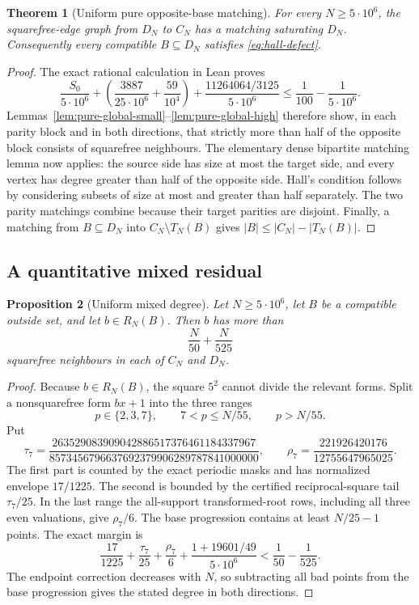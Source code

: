 \documentclass[11pt]{article}
\newtheorem{theorem}{Theorem}[section]
\newtheorem{proposition}[theorem]{Proposition}
\theoremstyle{definition}
\newcommand{\CN}{C_N}
\newcommand{\DN}{D_N}
\newcommand{\TN}{T_N}
\newcommand{\RN}{R_N}
\newcommand{\FiveMillion}{5\cdot10^6}
\begin{document}
\begin{theorem}[Uniform pure opposite-base matching]
\label{thm:pure-parity-matching}
For every $N\geq\FiveMillion$, the squarefree-edge graph from $\DN$ to
$\CN$ has a matching saturating $\DN$.  Consequently every compatible
$B\subseteq\DN$ satisfies \eqref{eq:hall-defect}.
\end{theorem}

\begin{proof}
The exact rational calculation in Lean proves
\begin{equation}\label{eq:pure-envelope}
 \frac{S_0}{\FiveMillion}
 +\left(\frac{3887}{25\cdot10^6}+\frac{59}{10^4}\right)
 +\frac{11264064/3125}{\FiveMillion}
 \leq\frac1{100}-\frac1{\FiveMillion}.
\end{equation}
Lemmas~\ref{lem:pure-global-small}--\ref{lem:pure-global-high} therefore
show, in each parity block and in both directions, that strictly more than
half of the opposite block consists of squarefree neighbours.  The elementary
dense bipartite matching lemma now applies: the source side has size at most
the target side, and every vertex has degree greater than half of the
opposite side.  Hall's condition follows by considering subsets of size at
most and greater than half separately.  The two parity matchings combine
because their target parities are disjoint.  Finally, a matching from
$B\subseteq\DN$ into $\CN\setminus\TN(B)$ gives
$|B|\leq|\CN|-|\TN(B)|$.
\end{proof}

\subsection{A quantitative mixed residual}

\begin{proposition}[Uniform mixed degree]\label{prop:uniform-mixed-degree}
Let $N\geq\FiveMillion$, let $B$ be a compatible outside set, and let
$b\in\RN(B)$.  Then $b$ has more than
\[
  \frac N{50}+\frac N{525}
\]
squarefree neighbours in each of $\CN$ and $\DN$.
\end{proposition}

\begin{proof}
Because $b\in\RN(B)$, the square $5^2$ cannot divide the relevant forms.
Split a nonsquarefree form $bx+1$ into the three ranges
\[
 p\in\{2,3,7\},\qquad 7<p\leq N/55,\qquad p>N/55.
\]
Put
\[
 \tau_7=
 \frac{263529083909042886517376461184337967}
 {8573456796637692379906289787841000000},
 \qquad
 \rho_7=\frac{221926420176}{12755647965025}.
\]
The first part is counted by the exact periodic masks and has normalized
envelope $17/1225$.  The second is bounded by the certified reciprocal-square
tail $\tau_7/25$.  In the last range the all-support transformed-root rows,
including all three even valuations, give $\rho_7/6$.  The base progression
contains at least $N/25-1$ points.  The exact margin is
\[
 \frac{17}{1225}
 +\frac{\tau_7}{25}
 +\frac{\rho_7}6
 +\frac{1+19601/49}{\FiveMillion}
 <\frac1{50}-\frac1{525}.
\]
The endpoint correction decreases with $N$, so subtracting all bad points
from the base progression gives the stated degree in both directions.
\end{proof}
\end{document}
